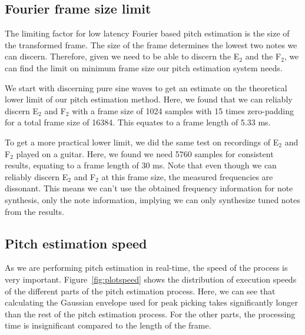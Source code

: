 \documentclass[a4paper,10pt,twocolumn]{article}
\newcommand{\note}[2]{#1${}_{#2}$}
\begin{document}
\subsection{Fourier frame size limit}
The limiting factor for low latency Fourier based pitch estimation is the size of the transformed frame. The size of the frame determines the lowest two notes we can discern. Therefore, given we need to be able to discern the \note{E}{2} and the \note{F}{2}, we can find the limit on minimum frame size our pitch estimation system needs.

We start with discerning pure sine waves to get an estimate on the theoretical lower limit of our pitch estimation method. Here, we found that we can reliably discern \note{E}{2} and \note{F}{2} with a frame size of 1024 samples with 15 times zero-padding for a total frame size of 16384. This equates to a frame length of 5.33 ms.

To get a more practical lower limit, we did the same test on recordings of \note{E}{2} and \note{F}{2} played on a guitar. Here, we found we need 5760 samples for consistent results, equating to a frame length of 30 ms. Note that even though we can reliably discern \note{E}{2} and \note{F}{2} at this frame size, the measured frequencies are dissonant. This means we can't use the obtained frequency information for note synthesis, only the note information, implying we can only synthesize tuned notes from the results.


\subsection{Pitch estimation speed}  \label{sub:expspeed}
As we are performing pitch estimation in real-time, the speed of the process is very important. Figure~\ref{fig:plotspeed} shows the distribution of execution speeds of the different parts of the pitch estimation process. Here, we can see that calculating the Gaussian envelope used for peak picking takes significantly longer than the rest of the pitch estimation process. For the other parts, the processing time is insignificant compared to the length of the frame.
\end{document}
